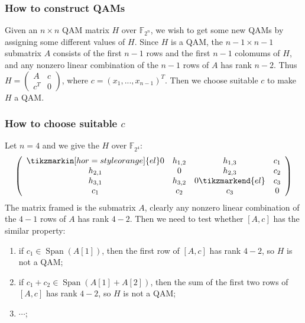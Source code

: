 \documentclass[
    aspectratio=169,                   %
]{beamer}
\newcommand{\F}{\mathbb{F}}
\begin{document}
    \begin{frame}
        \frametitle{How to construct QAMs}
        
        Given an $ n\times n $ QAM matrix $ H $ over $ \F_{2^n} $, we wish to get some new QAMs by assigning some 
        different values of $ H $. Since $ H $ is a QAM, the $ n-1\times n-1 $ submatrix $ A $ consists
        of the first $ n-1 $ rows and the first $ n-1 $ colomums of $ H $, 
        and any nonzero linear combination of the $n − 1$ rows of $A$ has rank $n − 2$. Thus $ H=\begin{pmatrix}
            A & c\\c^T & 0
        \end{pmatrix} $, where $ c=(x_1,...,x_{n-1})^T $. Then we choose suitable $ c $ to make $ H $ a QAM.
        
        
    \end{frame}   
    
    \begin{frame}
        \frametitle{How to choose suitable $ c $}
        
        \begin{example}
            Let $ n=4 $ and we give the $ H $ over $ \F_{2^4} $:
            \begin{equation}
                \left(\begin{array}{cccc}
                    \tikzmarkin[hor=style orange]{el}0       & h_{1,2} & h_{1,3}  &c_1\\
                     h_{2,1} & 0       & h_{2,3}  &c_2\\
                     h_{3,1} & h_{3,2} & 0   \tikzmarkend{el}     &c_3\\
                    c_1     &c_2     &c_3      &0      
                \end{array}
                \right)
            \end{equation}
            The matrix framed is the submatrix $ A $, clearly any nonzero linear combination of the $4 − 1$ rows 
            of $A$ has rank $4 − 2$. Then we need to test whether $ [A,c] $ has the similar property:
            \begin{enumerate}
                \item if $ c_1\in\operatorname{Span}(A[1]) $, then the first row of $ [A,c] $ has rank $ 4-2 $, 
                so $ H $ is not a QAM;
                \item if $ c_1+c_2\in\operatorname{Span}(A[1]+A[2]) $, then the sum of the first two rows of 
                $ [A,c] $ has rank $ 4-2 $, so $ H $ is not a QAM;
                \item $ \cdots $;
            \end{enumerate}
        \end{example}
        
        
    \end{frame}
    
\end{document}
